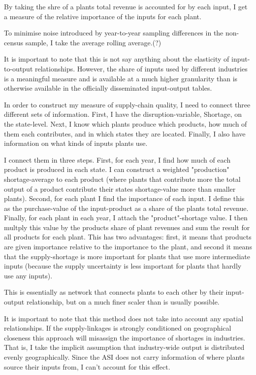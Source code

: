 \documentclass[11pt]{article}
\begin{document}
By taking the shre of a plants total revenue is accounted for by each input, I get a measure of the relative importance of the inputs for each plant. 

To minimise noise introduced by year-to-year sampling differences in the non-census sample, I take the average rolling average.(?)

It is important to note that this is not say anything about the elasticity of input-to-output relationships. However, the share of inputs used by different industries is a meaningful measure and is available at a much higher granularity than is otherwise available in the officially disseminated input-output tables. 


In order to construct my measure of supply-chain quality, I need to connect three different sets of information. First, I have the disruption-variable, Shortage, on the state-level. Next, I know which plants produce which products, how much of them each contributes, and in which states they are located. Finally, I also have information on what kinds of inputs plants use.

I connect them in three steps. First, for each year, I find how much of each product is produced in each state. I can construct a weighted "production" shortage-average to each product (where plants that contribute more the total output of a product contribute their states shortage-value more than smaller plants). Second, for each plant I find the importance of each input. I define this as the purchase-value of the input-product as a share of the plants total revenue. Finally, for each plant in each year, I attach the "product"-shortage value. I then multply this value by the products share of plant revenues and sum the result for all products for each plant. This has two advantages: first, it means that products are given importance relative to the importance to the plant, and second it means that the supply-shortage is more important for plants that use more intermediate inputs (because the supply uncertainty is less important for plants that hardly use any inputs).


This is essentially as network that connects plants to each other by their input-output relationship, but on a much finer scaler than is usually possible.  

It is important to note that this method does not take into account any spatial relationships. If the supply-linkages is strongly conditioned on geographical closeness this approach will misassign the importance of shortages in industries. That is, I take the implicit assumption that industry-wide output is distributed evenly geographically. Since the ASI does not carry information of where plants source their inputs from, I can't account for this effect.
\end{document}
